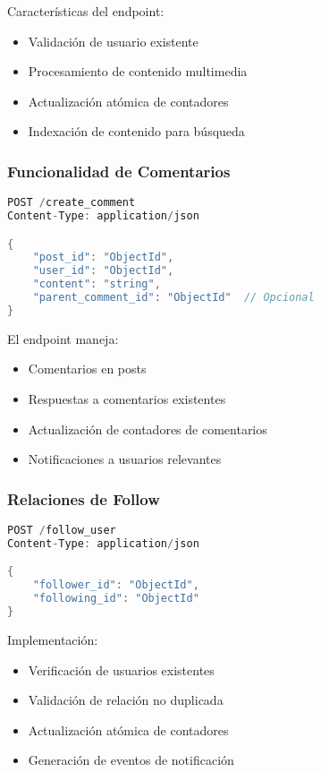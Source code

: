 \documentclass[12pt,letterpaper]{article}
\begin{document}
Características del endpoint:
\begin{itemize}
    \item Validación de usuario existente
    \item Procesamiento de contenido multimedia
    \item Actualización atómica de contadores
    \item Indexación de contenido para búsqueda
\end{itemize}

\subsubsection{Funcionalidad de Comentarios}
\begin{lstlisting}[language=rust]
POST /create_comment
Content-Type: application/json

{
    "post_id": "ObjectId",
    "user_id": "ObjectId",
    "content": "string",
    "parent_comment_id": "ObjectId"  // Opcional
}
\end{lstlisting}

El endpoint maneja:
\begin{itemize}
    \item Comentarios en posts
    \item Respuestas a comentarios existentes
    \item Actualización de contadores de comentarios
    \item Notificaciones a usuarios relevantes
\end{itemize}

\subsubsection{Relaciones de Follow}
\begin{lstlisting}[language=rust]
POST /follow_user
Content-Type: application/json

{
    "follower_id": "ObjectId",
    "following_id": "ObjectId"
}
\end{lstlisting}

Implementación:
\begin{itemize}
    \item Verificación de usuarios existentes
    \item Validación de relación no duplicada
    \item Actualización atómica de contadores
    \item Generación de eventos de notificación
\end{itemize}
\end{document}
